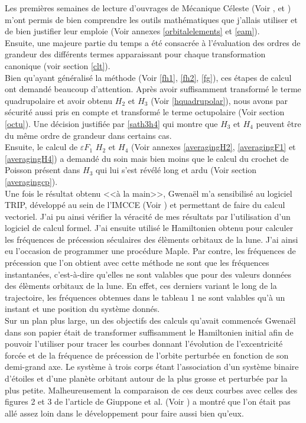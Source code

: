 \documentclass[a4paper]{article}
\begin{document}
\large{
Les premi\`eres semaines de lecture d'ouvrages de M\'ecanique C\'eleste (Voir \cite{Boccaletti1}, \cite{Boccaletti2} et \cite{Duriez}) m'ont permis de bien comprendre les outils math\'ematiques que j'allais utiliser et de bien justifier leur emploie (Voir annexes \ref{orbitalelements} et \ref{eam}). \\
Ensuite, une majeure partie du temps a \'et\'e consacr\'ee \`a l'\'evaluation des ordres de grandeur des diff\'erents termes apparaissant pour chaque transformation canonique (voir section \ref{clt}). \\
Bien qu'ayant g\'en\'eralis\'e la m\'ethode (Voir \eqref{fh1}, \eqref{fh2}, \eqref{fg}), ces \'etapes de calcul ont demand\'e beaucoup d'attention. Apr\`es avoir suffisamment transform\'e le terme quadrupolaire et avoir obtenu $H_{2}$ et $H_{3}$ (Voir \eqref{hquadrupolar}), nous avons par s\'ecurit\'e aussi pris en compte et transform\'e le terme octupolaire (Voir section \ref{octu}). Une d\'ecision justifi\'ee par \eqref{sath3h4} qui montre que $H_{3}$ et $H_{4}$ peuvent \^etre du m\^eme ordre de grandeur dans certains cas. \\
Ensuite, le calcul de $\varepsilon F_{1}$ $H_{2}$ et $H_{4}$ (Voir annexes \ref{averagingH2}, \ref{averagingF1} et \ref{averagingH4}) a demand\'e du soin mais bien moins que le calcul du crochet de Poisson pr\'esent dans $H_{3}$ qui lui s'est r\'ev\'el\'e long et ardu (Voir section \ref{averagingcp}). \\
Une fois le r\'esultat obtenu <<\`a la main>>, Gwena\"el m'a sensibilis\'e au logiciel TRIP, d\'evelopp\'e au sein de l'IMCCE (Voir \cite{trip}) et permettant de faire du calcul vectoriel. J'ai pu ainsi v\'erifier la v\'eracit\'e de mes r\'esultats par l'utilisation d'un logiciel de calcul formel. 
J'ai ensuite utilis\'e le Hamiltonien obtenu pour calculer les fr\'equences de pr\'ecession s\'eculaires des \'el\`ements orbitaux de la lune. J'ai ainsi eu l'occasion de programmer une proc\'edure Maple. Par contre, les fr\'equences de pr\'ecession que l'on obtient avec cette m\'ethode ne sont que les fr\'equences instantan\'ees, c'est-\`a-dire qu'elles ne sont valables que pour des valeurs donn\'ees des \'el\`ements orbitaux de la lune. En effet, ces derniers variant le long de la trajectoire, les fr\'equences obtenues dans le tableau 1 ne sont valables qu'\`a un instant et une position du syst\`eme donn\'es. \\
Sur un plan plus large, un des objectifs des calculs qu'avait commenc\'es Gwena\"el dans son papier \'etait de transformer suffisamment le Hamiltonien initial afin de pouvoir l'utiliser pour tracer les courbes donnant l'\'evolution de l'excentricit\'e forc\'ee et de la fr\'equence de pr\'ecession de l'orbite perturb\'ee en fonction de son demi-grand axe. Le syst\`eme \`a trois corps \'etant l'association d'un syst\`eme binaire d'\'etoiles et d'une plan\`ete orbitant autour de la plus grosse et perturb\'ee par la plus petite. Malheureusement la comparaison de ces deux courbes avec celles des figures 2 et 3 de l'article de Giuppone et al. (Voir \cite{giuppone}) a montr\'e que l'on \'etait pas all\'e assez loin dans le d\'eveloppement pour faire aussi bien qu'eux. \\
}
\end{document}
